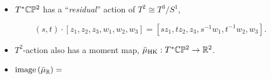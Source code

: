 \begin{frame}
    \begin{itemize}
        \item $T^{\ast}\mathbb{C}\mathbb{P}^{2}$ has a ``\emph{residual}'' action of $T^{2} \cong T^{3}/S^{1}$,
    \end{itemize}
    \[
        (s,t)\cdot [z_{1},z_{2},z_{3}, w_{1}, w_{2}, w_{3}] = [sz_{1},tz_{2},z_{3}, s^{-1}w_{1}, t^{-1}w_{2}, w_{3}].    
    \]
    \begin{itemize}
        \item $T^{2}$-action also has a moment map, $\bar{\mu}_{\operatorname{HK}} : T^{\ast}\mathbb{C}\mathbb{P}^{2} \rightarrow \mathbb{R}^{2}$.
    \end{itemize}

    \begin{itemize}
        \item $\operatorname{image}{(\bar{\mu}_{\mathbb{R}})} =$
    \end{itemize}
\end{frame}